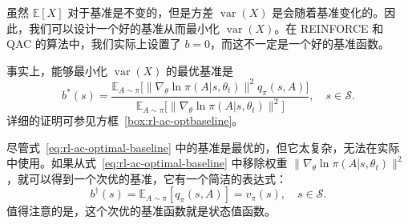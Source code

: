 虽然 $\mathbb{E}[X]$ 对于基准是不变的，但是方差 $\operatorname{var}(X)$ 是会随着基准变化的。因此，我们可以设计一个好的基准从而最小化 $\operatorname{var}(X)$。在 REINFORCE 和 QAC 的算法中，我们实际上设置了 $b = 0$，而这不一定是一个好的基准函数。

事实上，能够最小化 $\operatorname{var}(X)$ 的最优基准是
\begin{equation}
b^{*}(s) = \frac{\mathbb{E}_{A \sim \pi} \big[ \| \nabla_{\theta} \ln \pi(A | s, \theta_{t}) \|^{2} q_{\pi}(s, A) \big]}{\mathbb{E}_{A \sim \pi} \big[ \| \nabla_{\theta} \ln \pi(A | s, \theta_{t}) \|^{2} \big]}, \quad s \in \mathcal{S}.
\label{eq:rl-ac-optimal-baseline}
\end{equation}
详细的证明可参见方框~\ref{box:rl-ac-optbaseline}。

尽管式~\eqref{eq:rl-ac-optimal-baseline} 中的基准是最优的，但它太复杂，无法在实际中使用。如果从式~\eqref{eq:rl-ac-optimal-baseline} 中移除权重 $\| \nabla_{\theta} \ln \pi(A | s, \theta_{t}) \|^{2}$，就可以得到一个次优的基准，它有一个简洁的表达式：
\[
b^{\dagger}(s) = \mathbb{E}_{A \sim \pi} [ q_{\pi}(s, A) ] = v_{\pi}(s), \quad s \in \mathcal{S}.
\]
值得注意的是，这个次优的基准函数就是状态值函数。

